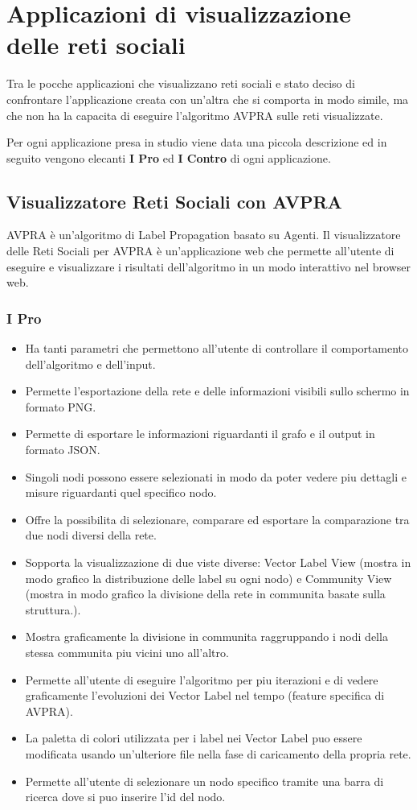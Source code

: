 \documentclass[a4paper,12pt]{report}
\begin{document}
	\section{Applicazioni di visualizzazione delle reti sociali}
		Tra le pocche applicazioni che visualizzano reti sociali e stato deciso di confrontare l'applicazione creata con un'altra che si comporta in modo simile, ma che non ha la capacita di eseguire l'algoritmo AVPRA sulle reti visualizzate.

		Per ogni applicazione presa in studio viene data una piccola descrizione ed in seguito vengono elecanti \textbf{I Pro} ed \textbf{I Contro} di ogni applicazione.

		\subsection{Visualizzatore Reti Sociali con AVPRA}
		AVPRA è un'algoritmo di Label Propagation basato su Agenti.
		Il visualizzatore delle Reti Sociali per AVPRA è un'applicazione web che permette all'utente di
		eseguire e visualizzare i risultati dell'algoritmo in un modo interattivo nel browser web.
		
			\subsubsection*{I Pro}
				\begin{itemize}
					\item Ha tanti parametri che permettono all'utente di controllare il comportamento dell'algoritmo e dell'input.
					\item Permette l'esportazione della rete e delle informazioni visibili sullo schermo in formato PNG.
					\item Permette di esportare le informazioni riguardanti il grafo e il output in formato JSON.
					\item Singoli nodi possono essere selezionati in modo da poter vedere piu dettagli e misure riguardanti quel specifico nodo.
					\item Offre la possibilita di selezionare, comparare ed esportare la comparazione tra due nodi diversi della rete.
					\item Sopporta la visualizzazione di due viste diverse: Vector Label View (mostra in modo grafico la distribuzione delle label su ogni nodo) e Community View (mostra in modo grafico la divisione della rete in communita basate sulla struttura.).
					\item Mostra graficamente la divisione in communita raggruppando i nodi della stessa communita piu vicini uno all'altro.
					\item Permette all'utente di eseguire l'algoritmo per piu iterazioni e di vedere graficamente l'evoluzioni dei Vector Label nel tempo (feature specifica di AVPRA).
					\item La paletta di colori utilizzata per i label nei Vector Label puo essere modificata usando un'ulteriore file nella fase di caricamento della propria rete.
					\item Permette all'utente di selezionare un nodo specifico tramite una barra di ricerca dove si puo inserire l'id del nodo.
				\end{itemize}
						
\end{document}
